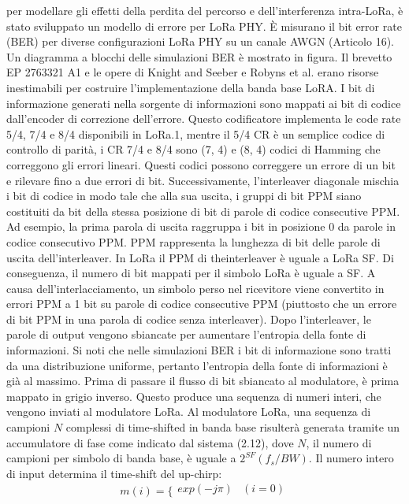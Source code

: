 \documentclass[a4paper]{report} %
\begin{document}
\begin{enumerate}
per modellare gli effetti della perdita del percorso e dell'interferenza intra-LoRa, è stato sviluppato un modello di errore per LoRa PHY. È misurano il bit error rate (BER) per diverse configurazioni LoRa PHY su un canale AWGN (Articolo 16). Un diagramma a blocchi delle simulazioni BER è mostrato in figura. Il brevetto EP 2763321 A1 e le opere di Knight and Seeber  e Robyns et al. erano risorse inestimabili per costruire l'implementazione della banda base LoRA. I bit di informazione generati nella sorgente di informazioni sono mappati ai bit di codice dall'encoder di correzione dell'errore. Questo codificatore implementa le code rate 5/4, 7/4 e 8/4 disponibili in LoRa.1, mentre il 5/4 CR è un semplice codice di controllo di parità, i CR 7/4 e 8/4 sono (7, 4) e (8, 4) codici di Hamming che correggono gli errori lineari. Questi codici possono correggere un errore di un bit e rilevare fino a due errori di bit. Successivamente, l'interleaver diagonale mischia i bit di codice in modo tale che alla sua uscita, i gruppi di bit PPM siano costituiti da bit della stessa posizione di bit di parole di codice consecutive PPM. Ad esempio, la prima parola di uscita raggruppa i bit in posizione 0 da parole in codice consecutivo PPM. PPM rappresenta la lunghezza di bit delle parole di uscita dell'interleaver. In LoRa il PPM di theinterleaver è uguale a LoRa SF. Di conseguenza, il numero di bit mappati per il simbolo LoRa è uguale a SF. A causa dell'interlacciamento, un simbolo perso nel ricevitore viene convertito in errori PPM a 1 bit su parole di codice consecutive PPM (piuttosto che un errore di bit PPM in una parola di codice senza interleaver). Dopo l'interleaver, le parole di output vengono sbiancate per aumentare l'entropia della fonte di informazioni. Si noti che nelle simulazioni BER i bit di informazione sono tratti da una distribuzione uniforme, pertanto l'entropia della fonte di informazioni è già al massimo. Prima di passare il flusso di bit sbiancato al modulatore, è prima mappato in grigio inverso. Questo produce una sequenza di numeri interi, che vengono inviati al modulatore LoRa. Al modulatore LoRa, una sequenza di campioni $N$ complessi di time-shifted in banda base risulterà generata tramite un accumulatore di fase come indicato dal sistema (2.12), dove $N$, il numero di campioni per simbolo di banda base, è uguale a $2^{SF} (f_s / BW)$. Il numero intero di input determina il time-shift del up-chirp:
\begin{equation}
m(i) = \bigg \{
\begin{array}{rl}
exp(-j\pi) & (i = 0)\\

\end{array}
\end{equation}
\end{enumerate}
\end{document}
